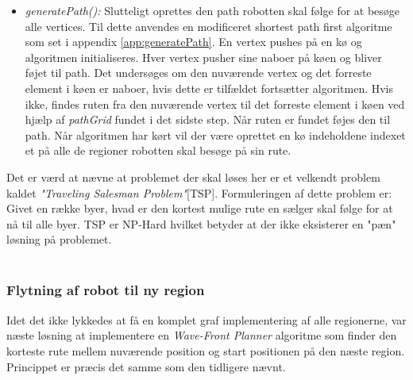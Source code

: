 \begin{itemize}
	 \item \emph{generatePath():} Slutteligt oprettes den path robotten skal følge for at besøge alle vertices. Til dette anvendes en modificeret shortest path first algoritme som set i appendix \ref{app:generatePath}. En vertex pushes på en kø og algoritmen initialiseres. Hver vertex pusher sine naboer på køen og bliver føjet til path. Det undersøges om den nuværende vertex og det forreste element i køen er naboer, hvis dette er tilfældet fortsætter algoritmen. Hvis ikke, findes ruten fra den nuværende vertex til det forreste element i køen ved hjælp af \emph{pathGrid} fundet i det sidste step. Når ruten er fundet føjes den til path. Når algoritmen har kørt vil der være oprettet en kø indeholdene indexet et på alle de regioner robotten skal besøge på sin rute.
\end{itemize}
Det er værd at nævne at problemet der skal løses her er et velkendt problem kaldet \textit{"Traveling Salesman Problem"}[TSP]. Formuleringen af dette problem er: Givet en række byer, hvad er den kortest mulige rute en sælger skal følge for at nå til alle byer. TSP er NP-Hard hvilket betyder at der ikke eksisterer en "pæn" løsning på problemet. \\~\\


\subsubsection{Flytning af robot til ny region}

Idet det ikke lykkedes at få en komplet graf implementering af alle regionerne, var næste løsning at implementere en \emph{Wave-Front Planner} algoritme som finder den korteste rute mellem nuværende position og start positionen på den næste region. Princippet er præcis det samme som den tidligere nævnt.



